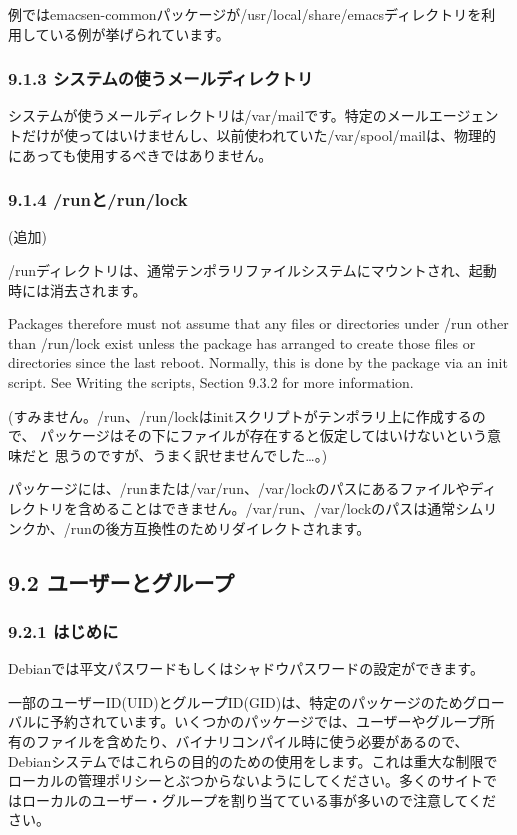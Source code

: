 \documentclass[mingoth,a4paper]{jsarticle}
\begin{document}
例ではemacsen-commonパッケージが/usr/local/share/emacsディレクトリを利
用している例が挙げられています。

\subsubsection{9.1.3 システムの使うメールディレクトリ}

システムが使うメールディレクトリは/var/mailです。特定のメールエージェン
トだけが使ってはいけませんし、以前使われていた/var/spool/mailは、物理的
にあっても使用するべきではありません。

\subsubsection{9.1.4 /runと/run/lock}

(追加)

/runディレクトリは、通常テンポラリファイルシステムにマウントされ、起動
時には消去されます。

Packages therefore must not assume that any files or directories under
/run other than /run/lock exist unless the package has arranged to
create those files or directories since the last reboot.
Normally, this is done by the package via an init script.
See Writing the scripts, Section 9.3.2 for more information.

(すみません。/run、/run/lockはinitスクリプトがテンポラリ上に作成するので、
パッケージはその下にファイルが存在すると仮定してはいけないという意味だと
思うのですが、うまく訳せませんでした…。)

パッケージには、/runまたは/var/run、/var/lockのパスにあるファイルやディ
レクトリを含めることはできません。/var/run、/var/lockのパスは通常シムリ
ンクか、/runの後方互換性のためリダイレクトされます。

\subsection{9.2 ユーザーとグループ}

\subsubsection{9.2.1 はじめに}

Debianでは平文パスワードもしくはシャドウパスワードの設定ができます。

一部のユーザーID(UID)とグループID(GID)は、特定のパッケージのためグロー
バルに予約されています。いくつかのパッケージでは、ユーザーやグループ所
有のファイルを含めたり、バイナリコンパイル時に使う必要があるので、
Debianシステムではこれらの目的のための使用をします。これは重大な制限で
ローカルの管理ポリシーとぶつからないようにしてください。多くのサイトで
はローカルのユーザー・グループを割り当てている事が多いので注意してくだ
さい。
\end{document}
